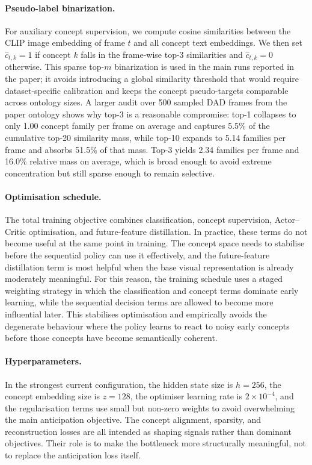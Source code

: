 \paragraph{Pseudo-label binarization.}
For auxiliary concept supervision, we compute cosine similarities between the
CLIP image embedding of frame $t$ and all concept text embeddings. We then set
$\hat{c}_{t,k}=1$ if concept $k$ falls in the frame-wise top-3 similarities and
$\hat{c}_{t,k}=0$ otherwise. This sparse top-$m$ binarization is used in the
main runs reported in the paper; it avoids introducing a global similarity
threshold that would require dataset-specific calibration and keeps the concept
pseudo-targets comparable across ontology sizes. A larger audit over 500
sampled DAD frames from the paper ontology shows why top-3 is a reasonable
compromise: top-1 collapses to only 1.00 concept family per frame on average
and captures 5.5\% of the cumulative top-20 similarity mass, while top-10
expands to 5.14 families per frame and absorbs 51.5\% of that mass. Top-3
yields 2.34 families per frame and 16.0\% relative mass on average, which is
broad enough to avoid extreme concentration but still sparse enough to remain
selective.

\paragraph{Optimisation schedule.}
The total training objective combines classification, concept supervision,
Actor--Critic optimisation, and future-feature distillation. In practice,
these terms do not become useful at the same point in training. The concept
space needs to stabilise before the sequential policy can use it effectively,
and the future-feature distillation term is most helpful when the base visual
representation is already moderately meaningful. For this reason, the training
schedule uses a staged weighting strategy in which the classification and
concept terms dominate early learning, while the sequential decision terms are
allowed to become more influential later. This stabilises optimisation and
empirically avoids the degenerate behaviour where the policy learns to react to
noisy early concepts before those concepts have become semantically coherent.

\paragraph{Hyperparameters.}
In the strongest current configuration, the hidden state size is
$h{=}256$, the concept embedding size is $z{=}128$, the optimiser learning
rate is $2\times10^{-4}$, and the regularisation terms use small but non-zero
weights to avoid overwhelming the main anticipation objective. The concept
alignment, sparsity, and reconstruction losses are all intended as shaping
signals rather than dominant objectives. Their role is to make the bottleneck
more structurally meaningful, not to replace the anticipation loss itself.

